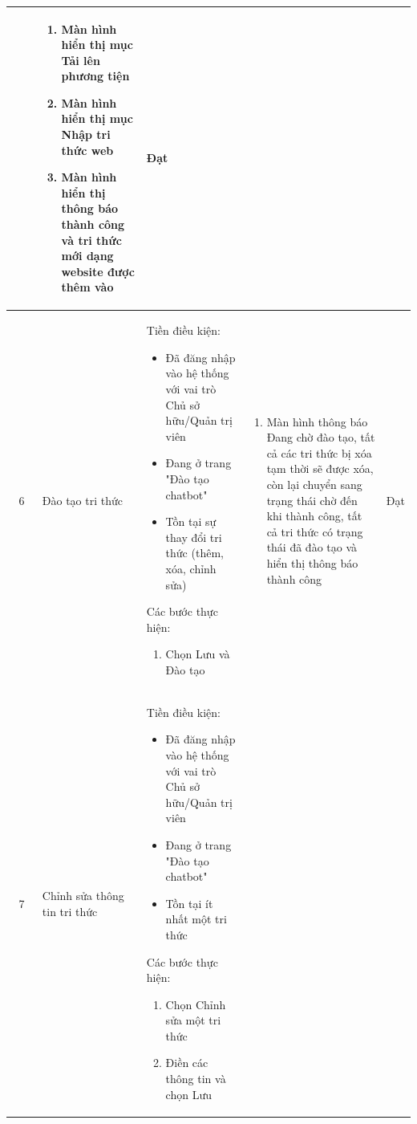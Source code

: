 \begin{longtable}{|c|m{2.5cm}|m{5.5cm}|m{4.5cm}|c|}
\begin{enumerate}[label=\arabic*.]
    \end{enumerate}
    & 
    \begin{enumerate}[label=\arabic*.]
        \item Màn hình hiển thị mục Tải lên phương tiện
        \item Màn hình hiển thị mục Nhập tri thức web
        \item Màn hình hiển thị thông báo thành công và tri thức mới dạng website được thêm vào 
    \end{enumerate}  & Đạt \\
    \hline
    6 & 
    Đào tạo tri thức & 
    Tiền điều kiện:
    \begin{itemize}
        \item Đã đăng nhập vào hệ thống với vai trò Chủ sở hữu/Quản trị viên
        \item Đang ở trang "Đào tạo chatbot"
        \item Tồn tại sự thay đổi tri thức (thêm, xóa, chỉnh sửa)
    \end{itemize}
    Các bước thực hiện: 
    \begin{enumerate}[label=\arabic*.]
        \item Chọn Lưu và Đào tạo
    \end{enumerate}
    & 
    \begin{enumerate}[label=\arabic*.]
        \item Màn hình thông báo Đang chờ đào tạo, tất cả các tri thức bị xóa tạm thời sẽ được xóa, còn lại chuyển sang trạng thái chờ đến khi thành công, tất cả tri thức có trạng thái đã đào tạo và hiển thị thông báo thành công
    \end{enumerate}  & Đạt \\
    \hline
    7 & 
    Chỉnh sửa thông tin tri thức & 
    Tiền điều kiện:
    \begin{itemize}
        \item Đã đăng nhập vào hệ thống với vai trò Chủ sở hữu/Quản trị viên
        \item Đang ở trang "Đào tạo chatbot"
        \item Tồn tại ít nhất một tri thức
    \end{itemize}
    Các bước thực hiện: 
    \begin{enumerate}[label=\arabic*.]
        \item Chọn Chỉnh sửa một tri thức
        \item Điền các thông tin và chọn Lưu
    \end{enumerate}
    & 
    \begin{enumerate}[label=\arabic*.]

\end{enumerate}
\end{longtable}
